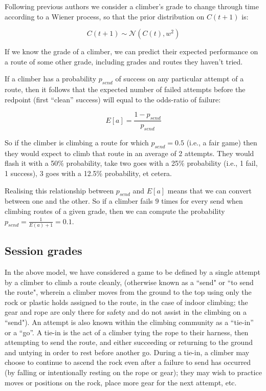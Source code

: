 \documentclass[ba]{imsart}
\begin{document}
Following previous authors  \citep{coulom2008whole,scarff2020estimation} we consider a climber's grade to change through time according to a Wiener process, so that the prior distribution on $C(t+1)$ is:

\begin{equation}
C(t+1) \sim \mathcal{N}(C(t), w^2)
\end{equation}

If we know the grade of a climber, we can predict their expected performance on a route of some other grade, including grades and routes they haven't tried.

If a climber has a probability $p_{send}$ of success on any particular attempt of a route, then it follows that the expected number of failed attempts before the redpoint (first ``clean'' success) will equal to the odds-ratio of failure:

\begin{equation}
 E\left[a\right]=\frac{1-p_{send}}{p_{send}}
 \end{equation}

 So if the climber is climbing a route for which $p_{send}=0.5$ (i.e., a fair game) then they would expect to climb that route in an average of 2 attempts. They would flash it with a 50\% probability, take two goes with a 25\% probability (i.e., 1 fail, 1 success), 3 goes with a 12.5\% probability, et cetera.

Realising this relationship between $p_{send}$ and $ E\left[a\right]$ means that we can convert between one and the other. So if a climber fails $9$ times for every send when climbing routes of a given grade, then we can compute the probability  $p_{send} = \frac{1}{E(a)+1} = 0.1$.

\subsection{Session grades}

In the above model, we have considered a game to be defined by a single attempt by a climber to climb a route cleanly, (otherwise known as a ``send" or ``to send the route", wherein a climber moves from the ground to the top using only the rock or plastic holds assigned to the route, in the case of indoor climbing; the gear and rope are only there for safety and do not assist in the climbing on a ``send"). An attempt is also known within the climbing community as a ``tie-in'' or a ``go''. A tie-in is the act of a climber tying the rope to their harness, then attempting to send the route, and either succeeding or returning to the ground and untying in order to rest before another go.  During a tie-in, a climber may choose to continue to ascend the rock even after a failure to send has occurred (by falling or intentionally resting on the rope or gear); they may wish to practice moves or positions on the rock, place more gear for the next attempt, etc.
\end{document}
